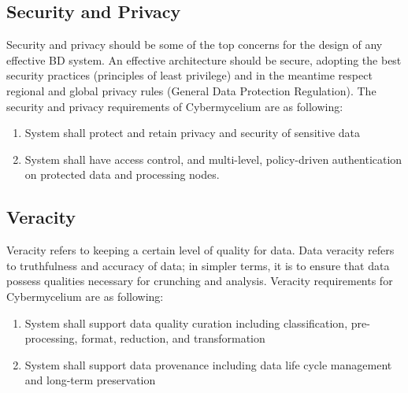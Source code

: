 \documentclass{bmcart}
\begin{document}
\subsection{Security and Privacy}

Security and privacy should be some of the top concerns for the design of any effective BD system. An effective architecture should be secure, adopting the best security practices (principles of least privilege) and in the meantime respect regional and global privacy rules (General Data Protection Regulation). The security and privacy requirements of Cybermycelium are as following:

\begin{enumerate}[label=\textbf{SaP-\arabic*}]
    \item System shall protect and retain privacy and security of sensitive data
    \item System shall have access control, and multi-level, policy-driven authentication on protected data and processing nodes.
\end{enumerate}

\subsection{Veracity}

Veracity refers to keeping a certain level of quality for data. Data veracity refers to truthfulness and accuracy of data; in simpler terms, it is to ensure that data possess qualities necessary for crunching and analysis. Veracity requirements for Cybermycelium are as following: 

\begin{enumerate}[label=\textbf{Ver-\arabic*}]
    \item System shall support data quality curation including classification, pre-processing, format, reduction, and transformation
    \item System shall support data provenance including data life cycle management and long-term preservation
\end{enumerate}




        
\end{document}
